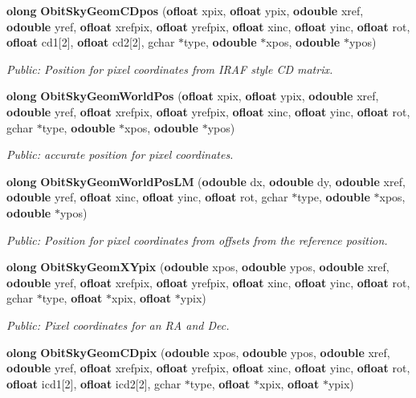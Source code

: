 \begin{CompactItemize}
{\bf olong} {\bf Obit\-Sky\-Geom\-CDpos} ({\bf ofloat} xpix, {\bf ofloat} ypix, {\bf odouble} xref, {\bf odouble} yref, {\bf ofloat} xrefpix, {\bf ofloat} yrefpix, {\bf ofloat} xinc, {\bf ofloat} yinc, {\bf ofloat} rot, {\bf ofloat} cd1[2], {\bf ofloat} cd2[2], gchar $\ast$type, {\bf odouble} $\ast$xpos, {\bf odouble} $\ast$ypos)
\begin{CompactList}\small\item\em Public: Position for pixel coordinates from IRAF style CD matrix. \item\end{CompactList}\item 
{\bf olong} {\bf Obit\-Sky\-Geom\-World\-Pos} ({\bf ofloat} xpix, {\bf ofloat} ypix, {\bf odouble} xref, {\bf odouble} yref, {\bf ofloat} xrefpix, {\bf ofloat} yrefpix, {\bf ofloat} xinc, {\bf ofloat} yinc, {\bf ofloat} rot, gchar $\ast$type, {\bf odouble} $\ast$xpos, {\bf odouble} $\ast$ypos)
\begin{CompactList}\small\item\em Public: accurate position for pixel coordinates. \item\end{CompactList}\item 
{\bf olong} {\bf Obit\-Sky\-Geom\-World\-Pos\-LM} ({\bf odouble} dx, {\bf odouble} dy, {\bf odouble} xref, {\bf odouble} yref, {\bf ofloat} xinc, {\bf ofloat} yinc, {\bf ofloat} rot, gchar $\ast$type, {\bf odouble} $\ast$xpos, {\bf odouble} $\ast$ypos)
\begin{CompactList}\small\item\em Public: Position for pixel coordinates from offsets from the reference position. \item\end{CompactList}\item 
{\bf olong} {\bf Obit\-Sky\-Geom\-XYpix} ({\bf odouble} xpos, {\bf odouble} ypos, {\bf odouble} xref, {\bf odouble} yref, {\bf ofloat} xrefpix, {\bf ofloat} yrefpix, {\bf ofloat} xinc, {\bf ofloat} yinc, {\bf ofloat} rot, gchar $\ast$type, {\bf ofloat} $\ast$xpix, {\bf ofloat} $\ast$ypix)
\begin{CompactList}\small\item\em Public: Pixel coordinates for an RA and Dec. \item\end{CompactList}\item 
{\bf olong} {\bf Obit\-Sky\-Geom\-CDpix} ({\bf odouble} xpos, {\bf odouble} ypos, {\bf odouble} xref, {\bf odouble} yref, {\bf ofloat} xrefpix, {\bf ofloat} yrefpix, {\bf ofloat} xinc, {\bf ofloat} yinc, {\bf ofloat} rot, {\bf ofloat} icd1[2], {\bf ofloat} icd2[2], gchar $\ast$type, {\bf ofloat} $\ast$xpix, {\bf ofloat} $\ast$ypix)

\end{CompactItemize}
